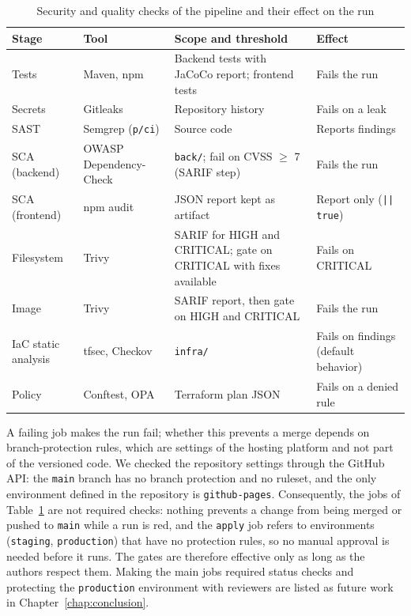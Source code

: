 \begin{table}[htbp]
\centering
\caption{Security and quality checks of the pipeline and their effect on the run}
\label{tab:gates}
\renewcommand{\arraystretch}{1.1}
\small
\begin{tabular}{@{}p{2.3cm}p{3cm}>{\raggedright\arraybackslash}p{5.9cm}>{\raggedright\arraybackslash}p{3.2cm}@{}}
\toprule
\textbf{Stage} & \textbf{Tool} & \textbf{Scope and threshold} & \textbf{Effect} \\
\midrule
Tests & Maven, npm & Backend tests with JaCoCo report; frontend tests & Fails the run \\
Secrets & Gitleaks & Repository history & Fails on a leak \\
SAST & Semgrep (\texttt{p/ci}) & Source code & Reports findings \\
SCA (backend) & OWASP Dependency-Check & \texttt{back/}; fail on CVSS $\geq$ 7 (SARIF step) & Fails the run \\
SCA (frontend) & npm audit & JSON report kept as artifact & Report only (\texttt{|| true}) \\
Filesystem & Trivy & SARIF for HIGH and CRITICAL; gate on CRITICAL with fixes available & Fails on CRITICAL \\
Image & Trivy & SARIF report, then gate on HIGH and CRITICAL & Fails the run \\
IaC static analysis & tfsec, Checkov & \texttt{infra/} & Fails on findings (default behavior) \\
Policy & Conftest, OPA & Terraform plan JSON & Fails on a denied rule \\
\bottomrule
\end{tabular}
\end{table}

A failing job makes the run fail; whether this prevents a merge depends on branch-protection rules, which are settings of the hosting platform and not part of the versioned code. We checked the repository settings through the GitHub API: the \texttt{main} branch has no branch protection and no ruleset, and the only environment defined in the repository is \texttt{github-pages}. Consequently, the jobs of Table~\ref{tab:gates} are not required checks: nothing prevents a change from being merged or pushed to \texttt{main} while a run is red, and the \texttt{apply} job refers to environments (\texttt{staging}, \texttt{production}) that have no protection rules, so no manual approval is needed before it runs. The gates are therefore effective only as long as the authors respect them. Making the main jobs required status checks and protecting the \texttt{production} environment with reviewers are listed as future work in Chapter~\ref{chap:conclusion}.

